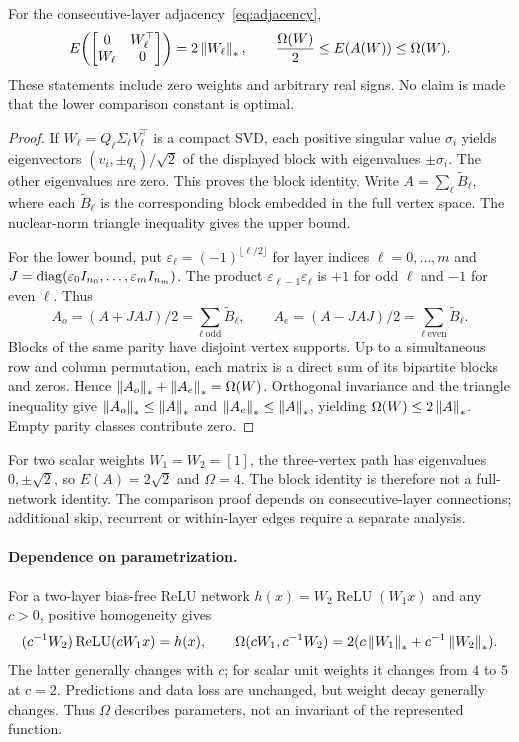 \begin{proposition}\label{prop:graph}
For the consecutive-layer adjacency~\eqref{eq:adjacency},
\begin{equation}\label{eq:bilateral}
 E\!\left(\begin{bmatrix}0&W_\ell^\top\\ W_\ell&0\end{bmatrix}\right)
 =2\left\lVert W_\ell\right\rVert_*,\qquad
 \frac{\Omega(W)}2\le E(A(W))\le\Omega(W).
\end{equation}
These statements include zero weights and arbitrary real signs. No claim is made that the lower comparison constant is optimal.
\end{proposition}
\begin{proof}
If $W_\ell=Q_\ell\Sigma_\ell V_\ell^\top$ is a compact SVD, each positive singular value $\sigma_i$ yields eigenvectors $(v_i,\pm q_i)/\sqrt2$ of the displayed block with eigenvalues $\pm\sigma_i$. The other eigenvalues are zero. This proves the block identity. Write $A=\sum_\ell\widetilde B_\ell$, where each $\widetilde B_\ell$ is the corresponding block embedded in the full vertex space. The nuclear-norm triangle inequality gives the upper bound.

For the lower bound, put $\varepsilon_\ell=(-1)^{\lfloor\ell/2\rfloor}$ for layer indices $\ell=0,\ldots,m$ and $J=\operatorname{diag}(\varepsilon_0 I_{n_0},\ldots,\varepsilon_m I_{n_m})$. The product $\varepsilon_{\ell-1}\varepsilon_\ell$ is $+1$ for odd $\ell$ and $-1$ for even $\ell$. Thus
\[
 A_o=(A+JAJ)/2=\sum_{\ell\ \text{odd}}\widetilde B_\ell,
 \qquad A_e=(A-JAJ)/2=\sum_{\ell\ \text{even}}\widetilde B_\ell.
\]
Blocks of the same parity have disjoint vertex supports. Up to a simultaneous row and column permutation, each matrix is a direct sum of its bipartite blocks and zeros. Hence $\left\lVert A_o\right\rVert_*+\left\lVert A_e\right\rVert_*=\Omega(W)$. Orthogonal invariance and the triangle inequality give $\left\lVert A_o\right\rVert_*\le\left\lVert A\right\rVert_*$ and $\left\lVert A_e\right\rVert_*\le\left\lVert A\right\rVert_*$, yielding $\Omega(W)\le2\left\lVert A\right\rVert_*$. Empty parity classes contribute zero.
\end{proof}

For two scalar weights $W_1=W_2=[1]$, the three-vertex path has eigenvalues $0,\pm\sqrt2$, so $E(A)=2\sqrt2$ and $\Omega=4$. The block identity is therefore not a full-network identity. The comparison proof depends on consecutive-layer connections; additional skip, recurrent or within-layer edges require a separate analysis.

\paragraph{Dependence on parametrization.}
For a two-layer bias-free ReLU network $h(x)=W_2\operatorname{ReLU}(W_1x)$ and any $c>0$, positive homogeneity gives
\[
 (c^{-1}W_2)\operatorname{ReLU}(cW_1x)=h(x),\qquad
 \Omega(cW_1,c^{-1}W_2)=2(c\left\lVert W_1\right\rVert_*+c^{-1}\left\lVert W_2\right\rVert_*).
\]
The latter generally changes with $c$; for scalar unit weights it changes from $4$ to $5$ at $c=2$. Predictions and data loss are unchanged, but weight decay generally changes. Thus $\Omega$ describes parameters, not an invariant of the represented function.

